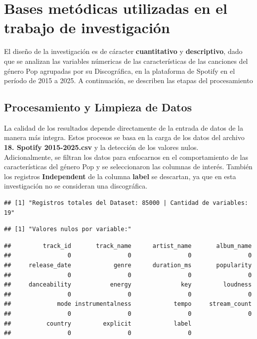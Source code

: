 \documentclass[oneside,11pt]{Latex/Classes/PhDthesisPSnPDF}
\begin{document}
\section{Bases metódicas utilizadas en el trabajo de investigación}

El diseño de la investigación es de cáracter \textbf{cuantitativo} y
\textbf{descriptivo}, dado que se analizan las variables númericas de
las características de las canciones del género Pop agrupadas por su
Discográfica, en la plataforma de Spotify en el período de 2015 a 2025.
A continuación, se describen las etapas del procesamiento\\

\subsection{Procesamiento y Limpieza de Datos}

La calidad de los resultados depende directamente de la entrada de datos
de la manera más integra. Estos procesos se basa en la carga de los
datos del archivo \textbf{18. Spotify 2015-2025.csv} y la detección de
los valores nulos.\\

Adicionalmente, se filtran los datos para enfocarnos en el
comportamiento de las características del género Pop y se seleccionaron
las columnas de interés. También los registros \textbf{Independent} de
la columna \textbf{label} se descartan, ya que en esta investigación no
se consideran una discográfica.\\

\begin{verbatim}
## [1] "Registros totales del Dataset: 85000 | Cantidad de variables: 19"
\end{verbatim}

\begin{verbatim}
## [1] "Valores nulos por variable:"
\end{verbatim}

\begin{verbatim}
##         track_id       track_name      artist_name       album_name 
##                0                0                0                0 
##     release_date            genre      duration_ms       popularity 
##                0                0                0                0 
##     danceability           energy              key         loudness 
##                0                0                0                0 
##             mode instrumentalness            tempo     stream_count 
##                0                0                0                0 
##          country         explicit            label 
##                0                0                0
\end{verbatim}
\end{document}
